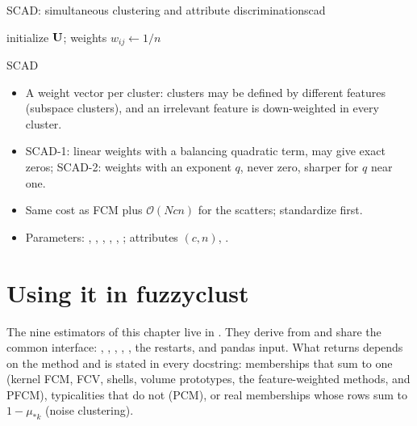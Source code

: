 \begin{algobox}{SCAD: simultaneous clustering and attribute discrimination}{scad}
\begin{algorithm}[H]
initialize $\mathbf{U}$; weights $w_{ij}\leftarrow1/n$\;
\end{algorithm}
\end{algobox}
\begin{summarybox}{SCAD}
\begin{itemize}
  \item A weight vector per cluster: clusters may be defined by different features (subspace clusters), and an irrelevant feature is down-weighted in every cluster.
  \item SCAD-1: linear weights with a balancing quadratic term, may give exact zeros; SCAD-2: weights with an exponent $q$, never zero, sharper for $q$ near one.
  \item Same cost as FCM plus $\mathcal{O}(Ncn)$ for the scatters; standardize first.
  \item Parameters: , , , , , ; attributes  $(c,n)$, .
\end{itemize}
\end{summarybox}

\section{Using it in fuzzyclust}\label{sec:robust:api}

The nine estimators of this chapter live in . They derive from  and share the common interface: , , , , , the  restarts, and pandas input. What  returns depends on the method and is stated in every docstring: memberships that sum to one (kernel FCM, FCV, shells, volume prototypes, the feature-weighted methods, and PFCM), typicalities that do not (PCM), or real memberships whose rows sum to $1-\mu_{*k}$ (noise clustering).

